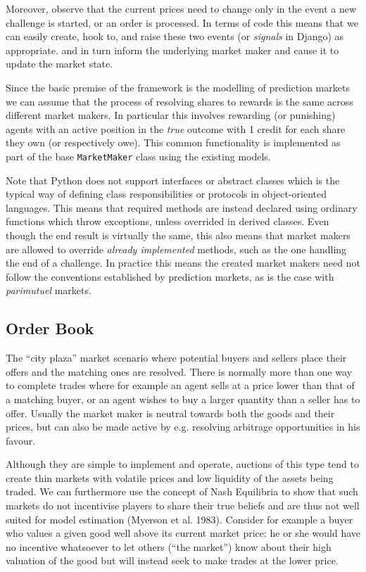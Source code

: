 \documentclass[bsc,frontabs,twoside,singlespacing,parskip,deptreport]{infthesis}     %
\begin{document}
\begin{itemize}
Moreover, observe that the current prices need to change only in the event a new challenge is started, or an order is processed. In terms of code this means that we can easily create, hook to, and raise these two events (or {\it signals} in Django) as appropriate.   and in turn inform the underlying market maker and cause it to update the market state.  

Since the basic premise of the framework is the modelling of prediction markets we can assume that the process of resolving shares to rewards is the same across different market makers. In particular this involves rewarding (or punishing) agents with an active position in the {\it true} outcome with 1 credit for each share they own (or respectively owe). This common functionality is implemented as part of the base {\tt MarketMaker} class using the existing models. 

	 Note that Python does not support interfaces or abstract classes which is the typical way of defining class responsibilities or protocols in object-oriented languages. This means that required methods are instead declared using ordinary functions which throw exceptions, unless overrided in derived classes. Even though the end result is virtually the same, this also means that market makers are allowed to override {\it already implemented} methods, such as the one handling the end of a challenge. In practice this means the created market makers need not follow the conventions established by prediction markets, as is the case with {\it parimutuel} markets. 


\subsection{Order Book}
    
    The “city plaza” market scenario where potential buyers and sellers place their offers and the matching ones are resolved. There is normally more than one way to complete trades where for example an agent sells at a price lower than that of a matching buyer, or an agent wishes to buy a larger quantity than a seller has to offer. Usually the market maker is neutral towards both the goods and their prices, but can also be made active by e.g. resolving arbitrage opportunities in his favour.

    Although they are simple to implement and operate, auctions of this type tend to create thin markets with volatile prices and low liquidity of the assets being traded. We can furthermore use the concept of Nash Equilibria to show that such markets do not incentivise players to share their true beliefs and are thus not well suited for model estimation (Myerson et al. 1983). Consider for example a buyer who values a given good well above its current market price: he or she would have no incentive whatsoever to let others (“the market”) know about their high valuation of the good but will instead seek to make trades at the lower price.


\end{itemize}
\end{document}
